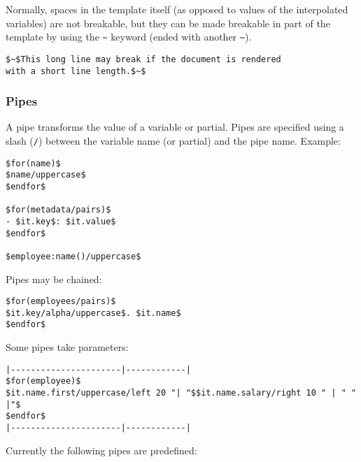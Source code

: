 \documentclass[]{article}
\begin{document}
Normally, spaces in the template itself (as opposed to values of the
interpolated variables) are not breakable, but they can be made
breakable in part of the template by using the
\texttt{\textasciitilde{}} keyword (ended with another
\texttt{\textasciitilde{}}).

\begin{verbatim}
$~$This long line may break if the document is rendered
with a short line length.$~$
\end{verbatim}

\hypertarget{pipes}{%
\subsubsection{Pipes}\label{pipes}}

A pipe transforms the value of a variable or partial. Pipes are
specified using a slash (\texttt{/}) between the variable name (or
partial) and the pipe name. Example:

\begin{verbatim}
$for(name)$
$name/uppercase$
$endfor$

$for(metadata/pairs)$
- $it.key$: $it.value$
$endfor$

$employee:name()/uppercase$
\end{verbatim}

Pipes may be chained:

\begin{verbatim}
$for(employees/pairs)$
$it.key/alpha/uppercase$. $it.name$
$endfor$
\end{verbatim}

Some pipes take parameters:

\begin{verbatim}
|----------------------|------------|
$for(employee)$
$it.name.first/uppercase/left 20 "| "$$it.name.salary/right 10 " | " " |"$
$endfor$
|----------------------|------------|
\end{verbatim}

Currently the following pipes are predefined:
\end{document}
